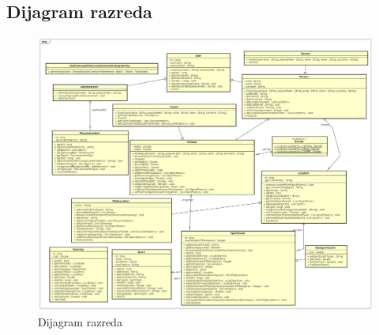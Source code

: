 			\eject
		\begin{landscape}
		
			\section{Dijagram razreda}
			\thispagestyle{empty}
			\begin{figure}[ht!]
				\centering
				\includegraphics[scale=0.35]{dijagrami/dijagram_razreda_domena.png}
				\caption{Dijagram razreda}
			\end{figure}
			
		\end{landscape}
		\restoregeometry
		\eject
		
